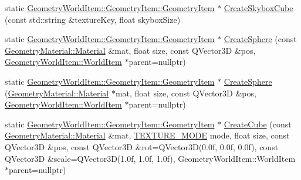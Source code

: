 \begin{DoxyCompactItemize}
\item 
static \mbox{\hyperlink{class_geometry_engine_1_1_geometry_world_item_1_1_geometry_item_1_1_geometry_item}{Geometry\+World\+Item\+::\+Geometry\+Item\+::\+Geometry\+Item}} $\ast$ \mbox{\hyperlink{class_geometry_engine_1_1_geometry_factory_ab1a5eb77d7902674d9b904a86dfaa87d}{Create\+Skybox\+Cube}} (const std\+::string \&texture\+Key, float skybox\+Size)
\item 
static \mbox{\hyperlink{class_geometry_engine_1_1_geometry_world_item_1_1_geometry_item_1_1_geometry_item}{Geometry\+World\+Item\+::\+Geometry\+Item\+::\+Geometry\+Item}} $\ast$ \mbox{\hyperlink{class_geometry_engine_1_1_geometry_factory_a10dc01e3e7982de326110dd5c374f83a}{Create\+Sphere}} (const \mbox{\hyperlink{class_geometry_engine_1_1_geometry_material_1_1_material}{Geometry\+Material\+::\+Material}} \&mat, float size, const Q\+Vector3D \&pos, \mbox{\hyperlink{class_geometry_engine_1_1_geometry_world_item_1_1_world_item}{Geometry\+World\+Item\+::\+World\+Item}} $\ast$parent=nullptr)
\item 
static \mbox{\hyperlink{class_geometry_engine_1_1_geometry_world_item_1_1_geometry_item_1_1_geometry_item}{Geometry\+World\+Item\+::\+Geometry\+Item\+::\+Geometry\+Item}} $\ast$ \mbox{\hyperlink{class_geometry_engine_1_1_geometry_factory_a01e71a4889500fd941c2c48be6676108}{Create\+Sphere}} (\mbox{\hyperlink{class_geometry_engine_1_1_geometry_material_1_1_material}{Geometry\+Material\+::\+Material}} $\ast$mat, float size, const Q\+Vector3D \&pos, \mbox{\hyperlink{class_geometry_engine_1_1_geometry_world_item_1_1_world_item}{Geometry\+World\+Item\+::\+World\+Item}} $\ast$parent=nullptr)
\item 
static \mbox{\hyperlink{class_geometry_engine_1_1_geometry_world_item_1_1_geometry_item_1_1_geometry_item}{Geometry\+World\+Item\+::\+Geometry\+Item\+::\+Geometry\+Item}} $\ast$ \mbox{\hyperlink{class_geometry_engine_1_1_geometry_factory_a3fbd736e23c92820e2a9ef7462682ac7}{Create\+Cube}} (const \mbox{\hyperlink{class_geometry_engine_1_1_geometry_material_1_1_material}{Geometry\+Material\+::\+Material}} \&mat, \mbox{\hyperlink{namespace_geometry_engine_a8502c4e17f01f5fe92f879776759e572}{T\+E\+X\+T\+U\+R\+E\+\_\+\+M\+O\+DE}} mode, float size, const Q\+Vector3D \&pos, const Q\+Vector3D \&rot=Q\+Vector3D(0.\+0f, 0.\+0f, 0.\+0f), const Q\+Vector3\+D \&scale=\+Q\+Vector3\+D(1.\+0f, 1.\+0f, 1.\+0f), Geometry\+World\+Item\+::\+World\+Item $\ast$parent=nullptr)
\item 

\end{DoxyCompactItemize}
